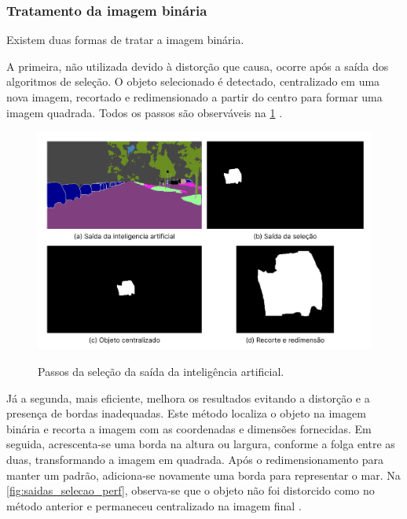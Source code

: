 \subsubsection*{Tratamento da imagem binária}

Existem duas formas de tratar a imagem binária.

A primeira, não utilizada devido à distorção que causa, ocorre após a saída dos algoritmos de seleção. O objeto selecionado é detectado, centralizado em uma nova imagem, recortado e redimensionado a partir do centro para formar uma imagem quadrada. Todos os passos são observáveis na \cref{fig:saidas_selecao} \cite{Embarcados}.

\begin{figure}[!ht]
\centering
\caption{Passos da seleção da saída da inteligência artificial.}
\includegraphics[width=1.0\textwidth]{figures/saidas_selecao.png}
\label{fig:saidas_selecao}
\end{figure}

Já a segunda, mais eficiente, melhora os resultados evitando a distorção e a presença de bordas inadequadas. Este método localiza o objeto na imagem binária e recorta a imagem com as coordenadas e dimensões fornecidas. Em seguida, acrescenta-se uma borda na altura ou largura, conforme a folga entre as duas, transformando a imagem em quadrada. Após o redimensionamento para manter um padrão, adiciona-se novamente uma borda para representar o mar. Na \cref{fig:saidas_selecao_perf}, observa-se que o objeto não foi distorcido como no método anterior e permaneceu centralizado na imagem final \cite{Embarcados}.

